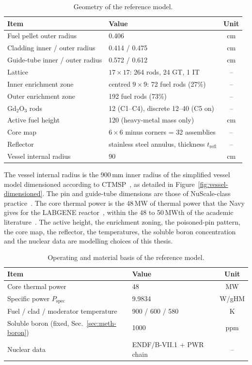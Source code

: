 \begin{table}[htbp]
  \centering
  \caption{Geometry of the reference model.}
  \label{tab:model-geometry}
  \begin{tabular}{llc}
    \toprule
    Item & Value & Unit \\
    \midrule
    Fuel pellet outer radius & 0.406 & cm \\
    Cladding inner / outer radius & 0.414 / 0.475 & cm \\
    Guide-tube inner / outer radius & 0.572 / 0.612 & cm \\
    Lattice & $17\times17$: 264 rods, 24 GT, 1 IT & -- \\
    Inner enrichment zone & centred $9\times9$: 72 fuel rods (27\%) & -- \\
    Outer enrichment zone & 192 fuel rods (73\%) & -- \\
    Gd$_2$O$_3$ rods & 12 (C1--C4), discrete 12--40 (C5 on) & -- \\
    Active fuel height & 120 (heavy-metal mass only) & cm \\
    Core map & $6\times6$ minus corners = 32 assemblies & -- \\
    Reflector & stainless steel annulus, thickness $t_\mathrm{refl}$ & -- \\
    Vessel internal radius & 90 & cm \\
    \bottomrule
  \end{tabular}
\end{table}

The vessel internal radius is the 900\,mm inner radius of the simplified
vessel model dimensioned according to CTMSP~\cite{maruyama_2013}, as
detailed in Figure~\ref{fig:vessel-dimensioned}. The pin
and guide-tube dimensions are those of NuScale-class
practice~\cite{nuscale_htp2_2017}. The core thermal power is the
48\,MW of thermal power that the Navy gives for the LABGENE
reactor~\cite{demartini_nuclep_2022}, within the 48 to 50\,MWth of the
academic literature~\cite{dinizcosta_2017}. The active height, the
enrichment zoning, the poisoned-pin pattern, the core map, the
reflector, the temperatures, the soluble boron concentration and the
nuclear data are modelling choices of this thesis.

\begin{table}[htbp]
  \centering
  \caption{Operating and material basis of the reference model.}
  \label{tab:model-operating}
  \begin{tabular}{llc}
    \toprule
    Item & Value & Unit \\
    \midrule
    Core thermal power & 48 & MW \\
    Specific power $P_\mathrm{spec}$ & 9.9834 & W/gHM \\
    Fuel / clad / moderator temperature & 900 / 600 / 580 & K \\
    Soluble boron (fixed, Sec.~\ref{sec:meth-boron}) & 1000 & ppm \\
    Nuclear data & ENDF/B-VII.1 + PWR chain & -- \\
    \bottomrule
  \end{tabular}
\end{table}

